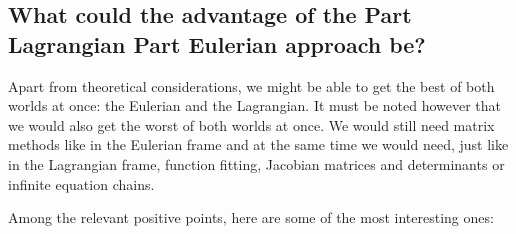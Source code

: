 \documentclass[11pt, a4paper]{article} %
\begin{document}




\newpage
\subsection*{What could the advantage of the Part Lagrangian Part Eulerian approach be?}
Apart from theoretical considerations, we might be able to get the best of both worlds at once: the Eulerian and the Lagrangian. It must be noted however that we would also get the worst of both worlds at once. We would still need matrix methods like in the Eulerian frame and at the same time we would need, just like in the Lagrangian frame, function fitting, Jacobian matrices and determinants or infinite equation chains.

Among the relevant positive points, here are some of the most interesting ones:
\end{document}
